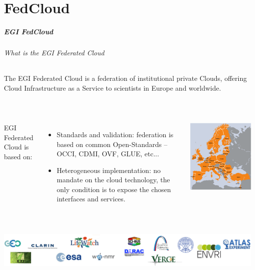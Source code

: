 \part{FedCloud}

\begin{frame}
  \frametitle{EGI FedCloud}
  \framesubtitle{What is the EGI Federated Cloud}
    The EGI Federated Cloud is a federation of institutional private Clouds,
    offering Cloud Infrastructure as a Service to scientists in Europe
    and worldwide.

  \hfill\\

  \begin{columns}
        EGI Federated Cloud is based on:
        \begin{itemize}
            \item Standards and validation: federation is based on common
            Open-Standards – OCCI, CDMI, OVF, GLUE, etc...
            \item Heterogeneous implementation: no mandate on the cloud
            technology, the only condition is to expose the chosen
            interfaces and services.
        \end{itemize}

        \includegraphics[width=\textwidth]{images/fedcloud_map}
  \end{columns}

  \hfill\\
      \includegraphics[width=\textwidth]{images/fedcloud_usecases}
\end{frame}


